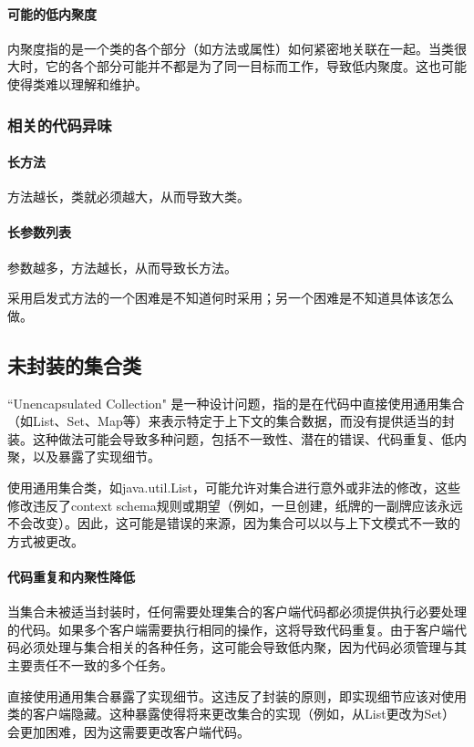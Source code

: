 \paragraph{可能的低内聚度}内聚度指的是一个类的各个部分（如方法或属性）如何紧密地关联在一起。当类很大时，它的各个部分可能并不都是为了同一目标而工作，导致低内聚度。这也可能使得类难以理解和维护。

\subsubsection{相关的代码异味}
\paragraph{长方法}方法越长，类就必须越大，从而导致大类。
\paragraph{长参数列表}参数越多，方法越长，从而导致长方法。

采用启发式方法的一个困难是不知道何时采用；另一个困难是不知道具体该怎么做。

\subsection{未封装的集合类}

``Unencapsulated Collection" 是一种设计问题，指的是在代码中直接使用通用集合（如List、Set、Map等）来表示特定于上下文的集合数据，而没有提供适当的封装。这种做法可能会导致多种问题，包括不一致性、潜在的错误、代码重复、低内聚，以及暴露了实现细节。

使用通用集合类，如java.util.List，可能允许对集合进行意外或非法的修改，这些修改违反了context schema规则或期望（例如，一旦创建，纸牌的一副牌应该永远不会改变）。因此，这可能是错误的来源，因为集合可以以与上下文模式不一致的方式被更改。

\paragraph{代码重复和内聚性降低}当集合未被适当封装时，任何需要处理集合的客户端代码都必须提供执行必要处理的代码。如果多个客户端需要执行相同的操作，这将导致代码重复。由于客户端代码必须处理与集合相关的各种任务，这可能会导致低内聚，因为代码必须管理与其主要责任不一致的多个任务。

直接使用通用集合暴露了实现细节。这违反了封装的原则，即实现细节应该对使用类的客户端隐藏。这种暴露使得将来更改集合的实现（例如，从List更改为Set）会更加困难，因为这需要更改客户端代码。

